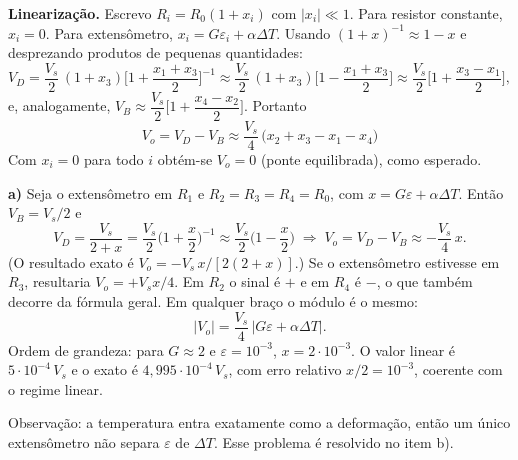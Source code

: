 \documentclass{article}%
\begin{document}
\textbf{Linearização.} Escrevo $R_i=R_0(1+x_i)$ com $|x_i|\ll 1$. Para resistor constante, $x_i=0$. Para extensômetro, $x_i=G\varepsilon_i+\alpha\Delta T$. Usando $(1+x)^{-1}\approx 1-x$ e desprezando produtos de pequenas quantidades:
\[
V_D=\frac{V_s}{2}\,(1+x_3)\Big[1+\frac{x_1+x_3}{2}\Big]^{-1}\approx\frac{V_s}{2}\,(1+x_3)\Big[1-\frac{x_1+x_3}{2}\Big]\approx\frac{V_s}{2}\Big[1+\frac{x_3-x_1}{2}\Big],
\]
e, analogamente, $V_B\approx\dfrac{V_s}{2}\Big[1+\dfrac{x_4-x_2}{2}\Big]$. Portanto
\[
\boxed{V_o=V_D-V_B\approx\frac{V_s}{4}\,\big(x_2+x_3-x_1-x_4\big)}
\]
Com $x_i=0$ para todo $i$ obtém-se $V_o=0$ (ponte equilibrada), como esperado.

\textbf{a)} Seja o extensômetro em $R_1$ e $R_2=R_3=R_4=R_0$, com $x=G\varepsilon+\alpha\Delta T$. Então $V_B=V_s/2$ e
\[
V_D=\frac{V_s}{2+x}=\frac{V_s}{2}\Big(1+\frac{x}{2}\Big)^{-1}\approx\frac{V_s}{2}\Big(1-\frac{x}{2}\Big)
\;\Rightarrow\; V_o=V_D-V_B\approx-\frac{V_s}{4}\,x .
\]
(O resultado exato é $V_o=-V_s\,x/[2(2+x)]$.) Se o extensômetro estivesse em $R_3$, resultaria $V_o=+V_s x/4$. Em $R_2$ o sinal é $+$ e em $R_4$ é $-$, o que também decorre da fórmula geral. Em qualquer braço o módulo é o mesmo:
\[
|V_o|=\frac{V_s}{4}\,\big|G\varepsilon+\alpha\Delta T\big|.
\]
Ordem de grandeza: para $G\approx2$ e $\varepsilon=10^{-3}$, $x=2\cdot10^{-3}$. O valor linear é $5\cdot10^{-4}\,V_s$ e o exato é $4{,}995\cdot10^{-4}\,V_s$, com erro relativo $x/2=10^{-3}$, coerente com o regime linear.

Observação: a temperatura entra exatamente como a deformação, então um único extensômetro não separa $\varepsilon$ de $\Delta T$. Esse problema é resolvido no item b).
\end{document}
